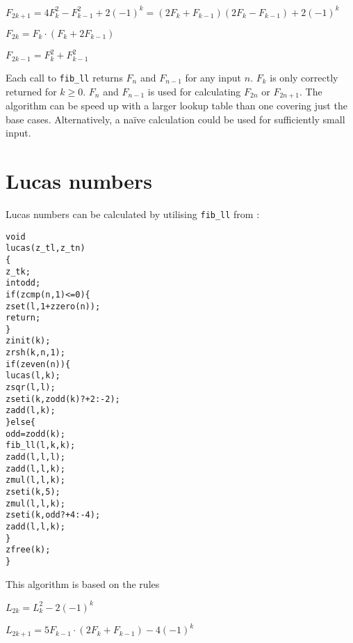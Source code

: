 \vspace{1em}
\( \displaystyle{
    F_{2k + 1} = 4F_k^2 - F_{k - 1}^2 + 2(-1)^k = (2F_k + F_{k-1})(2F_k - F_{k-1}) + 2(-1)^k
}\)
\vspace{1em}

\( \displaystyle{
    F_{2k} = F_k \cdot (F_k + 2F_{k - 1})
}\)
\vspace{1em}

\( \displaystyle{
    F_{2k - 1} = F_k^2 + F_{k - 1}^2
}\)
\vspace{1em}

\noindent
Each call to {\tt fib\_ll} returns $F_n$ and $F_{n - 1}$
for any input $n$. $F_{k}$ is only correctly returned
for $k \ge 0$. $F_n$ and $F_{n - 1}$ is used for
calculating $F_{2n}$ or $F_{2n + 1}$. The algorithm
can be speed up with a larger lookup table than one
covering just the base cases. Alternatively, a naïve
calculation could be used for sufficiently small input.


\newpage
\section{Lucas numbers}
\label{sec:Lucas numbers}

Lucas numbers can be calculated by utilising
{\tt fib\_ll} from :

\begin{alltt}
   void
   lucas(z_t l, z_t n)
   \{
       z_t k;
       int odd;
       if (zcmp(n, 1) <= 0) \{
           zset(l, 1 + zzero(n));
           return;
       \}
       zinit(k);
       zrsh(k, n, 1);
       if (zeven(n)) \{
           lucas(l, k);
           zsqr(l, l);
           zseti(k, zodd(k) ? +2 : -2);
           zadd(l, k);
       \} else \{
           odd = zodd(k);
           fib_ll(l, k, k);
           zadd(l, l, l);
           zadd(l, l, k);
           zmul(l, l, k);
           zseti(k, 5);
           zmul(l, l, k);
           zseti(k, odd ? +4 : -4);
           zadd(l, l, k);
       \}
       zfree(k);
   \}
\end{alltt}

\noindent
This algorithm is based on the rules

\vspace{1em}
\( \displaystyle{
    L_{2k} = L_k^2 - 2(-1)^k
}\)
\vspace{1ex}

\( \displaystyle{
    L_{2k + 1} = 5F_{k - 1} \cdot (2F_k + F_{k - 1}) - 4(-1)^k
}\)
\vspace{1em}

